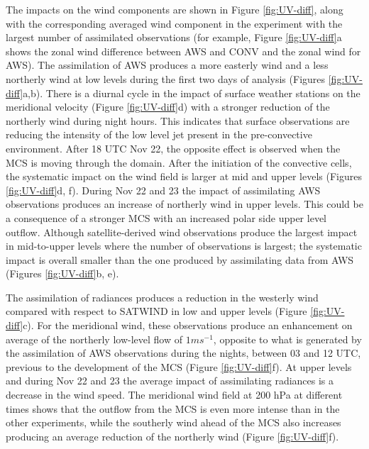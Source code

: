 \documentclass[authoryear,preprint,review,12pt]{elsarticle} %
\begin{document}
The impacts on the wind components are shown in Figure \ref{fig:UV-diff}, along with the corresponding averaged wind component in the experiment with the largest number of assimilated observations (for example, Figure \ref{fig:UV-diff}a shows the zonal wind difference between AWS and CONV and the zonal wind for AWS). The assimilation of AWS produces a more easterly wind and a less northerly wind at low levels during the first two days of analysis (Figures \ref{fig:UV-diff}a,b). There is a diurnal cycle in the impact of surface weather stations on the meridional velocity (Figure \ref{fig:UV-diff}d) with a stronger reduction of the northerly wind during night hours. This indicates that surface observations are reducing the intensity of the low level jet present in the pre-convective environment. After 18 UTC Nov 22, the opposite effect is observed when the MCS is moving through the domain. After the initiation of the convective cells, the systematic impact on the wind field is larger at mid and upper levels (Figures \ref{fig:UV-diff}d, f). During Nov 22 and 23 the impact of assimilating AWS observations produces an increase of northerly wind in upper levels. This could be a consequence of a stronger MCS with an increased polar side upper level outflow. Although satellite-derived wind observations produce the largest impact in mid-to-upper levels where the number of observations is largest; the systematic impact is overall smaller than the one produced by assimilating data from AWS (Figures \ref{fig:UV-diff}b, e).

The assimilation of radiances produces a reduction in the westerly wind compared with respect to SATWIND in low and upper levels (Figure \ref{fig:UV-diff}c). For the meridional wind, these observations produce an enhancement on average of the northerly low-level flow of \(1 ms^{-1}\), opposite to what is generated by the assimilation of AWS observations during the nights, between 03 and 12 UTC, previous to the development of the MCS (Figure \ref{fig:UV-diff}f). At upper levels and during Nov 22 and 23 the average impact of assimilating radiances is a decrease in the wind speed. The meridional wind field at 200 hPa at different times shows that the outflow from the MCS is even more intense than in the other experiments, while the southerly wind ahead of the MCS also increases producing an average reduction of the northerly wind (Figure \ref{fig:UV-diff}f).
\end{document}

